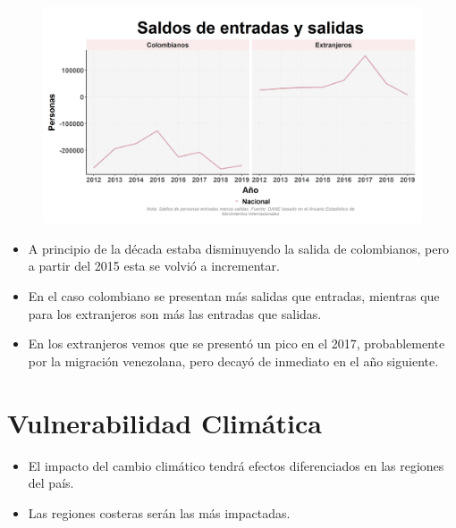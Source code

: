     \begin{figure}[H]
        \caption[Saldos de entradas y salidas a nivel nacional de colombianos y extranjeros ]{\label{saldos_nacionalidad} }
        \begin{center}
        \includegraphics[width=\textwidth,keepaspectratio]{img/var_237_trend.png}
        \end{center}
    \end{figure}
            \begin{itemize}
                    \item A principio de la década estaba disminuyendo la salida de colombianos, pero a partir del 2015 esta se volvió a incrementar.
                    \item En el caso colombiano se presentan más salidas que entradas, mientras que para los extranjeros son más las entradas que salidas.
                    \item En los extranjeros vemos que se presentó un pico en el 2017, probablemente por la migración venezolana, pero decayó de inmediato en el año siguiente.
                    \end{itemize}

\section{Vulnerabilidad Climática}


    \begin{tcolorbox}[enhanced, colback=mycolor,colframe=mycolor,drop fuzzy shadow,watermark color=white,
                        title=Principales Resultados]
    
            \begin{itemize}
                    \item El impacto del cambio climático tendrá efectos diferenciados en las regiones del país.
                    \item Las regiones costeras serán las más impactadas.
            \end{itemize}
     
    \end{tcolorbox}
    

